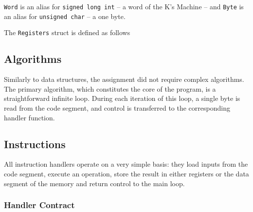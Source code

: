 \documentclass[10pt,a4paper,final]{article}
\newcommand{\code}[1]{\texttt{#1}}
\newenvironment{note}[1]{\begin{notes}\item #1}{\end{notes}}
\begin{document}
\begin{note}
\code{Word} is an alias for \code{signed long int} -- a word of the K's Machine
-- and \code{Byte} is an alias for \code{unsigned char} -- a one byte.
\end{note}

The \hypertarget{registers}{\code{Registers}} struct is defined as follows 

\begin{center}
\end{center}

\subsection{Algorithms}
\label{sec:algorithms}

Similarly to data structures, the assignment did not require complex algorithms.
The primary algorithm, which constitutes the core of the program, is a
straightforward infinite loop. During each iteration of this loop, a single byte
is read from the code segment, and control is transferred to the corresponding
handler function. 

\subsection{Instructions}
\label{sec:instructions}

All instruction handlers operate on a very simple basis: they load inputs from
the code segment, execute an operation, store the result in either registers or
the data segment of the memory and return control to the main loop. 

\subsubsection{Handler Contract}
\label{sec:contract}
\end{document}
